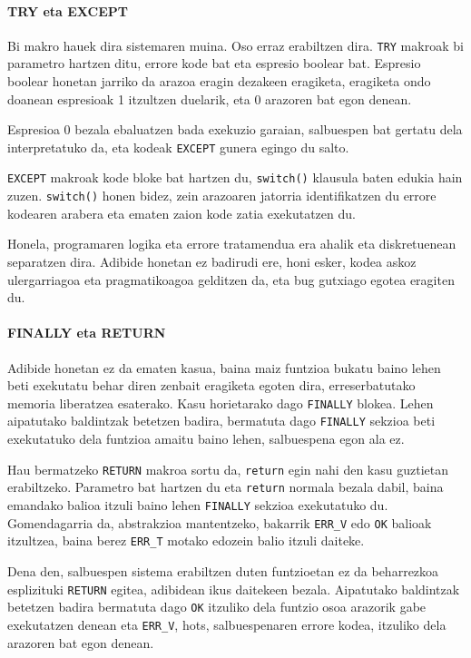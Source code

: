 \documentclass[10pt,a4paper,basque]{article}
\begin{document}
\paragraph{TRY eta EXCEPT}
Bi makro hauek dira sistemaren muina. Oso erraz erabiltzen dira. \verb|TRY| makroak bi parametro hartzen ditu, errore kode bat eta espresio boolear bat. Espresio boolear honetan jarriko da arazoa eragin dezakeen eragiketa, eragiketa ondo doanean espresioak 1 itzultzen duelarik, eta 0 arazoren bat egon denean.

Espresioa 0 bezala ebaluatzen bada exekuzio garaian, salbuespen bat gertatu dela interpretatuko da, eta kodeak \verb|EXCEPT| gunera egingo du salto.

\verb|EXCEPT| makroak kode bloke bat hartzen du, \verb|switch()| klausula baten edukia hain zuzen. \verb|switch()| honen bidez, zein arazoaren jatorria identifikatzen du errore kodearen arabera eta ematen zaion kode zatia exekutatzen du.

Honela, programaren logika eta errore tratamendua era ahalik eta diskretuenean separatzen dira. Adibide honetan ez badirudi ere, honi esker, kodea askoz ulergarriagoa eta pragmatikoagoa gelditzen da, eta bug gutxiago egotea eragiten du.

\paragraph{FINALLY eta RETURN}
Adibide honetan ez da ematen kasua, baina maiz funtzioa bukatu baino lehen beti exekutatu behar diren zenbait eragiketa egoten dira, erreserbatutako memoria liberatzea esaterako. Kasu horietarako dago \verb|FINALLY| blokea. Lehen aipatutako baldintzak betetzen badira, bermatuta dago \verb|FINALLY| sekzioa beti exekutatuko dela funtzioa amaitu baino lehen, salbuespena egon ala ez.

Hau bermatzeko \verb|RETURN| makroa sortu da, \verb|return| egin nahi den kasu guztietan erabiltzeko. Parametro bat hartzen du eta \verb|return| normala bezala dabil, baina emandako balioa itzuli baino lehen \verb|FINALLY| sekzioa exekutatuko du. Gomendagarria da, abstrakzioa mantentzeko, bakarrik \verb|ERR_V| edo \verb|OK| balioak itzultzea, baina berez \verb|ERR_T| motako edozein balio itzuli daiteke.

Dena den, salbuespen sistema erabiltzen duten funtzioetan ez da beharrezkoa esplizituki \verb|RETURN| egitea, adibidean ikus daitekeen bezala. Aipatutako baldintzak betetzen badira bermatuta dago \verb|OK| itzuliko dela funtzio osoa arazorik gabe exekutatzen denean eta \verb|ERR_V|, hots, salbuespenaren errore kodea, itzuliko dela arazoren bat egon denean.
\end{document}
